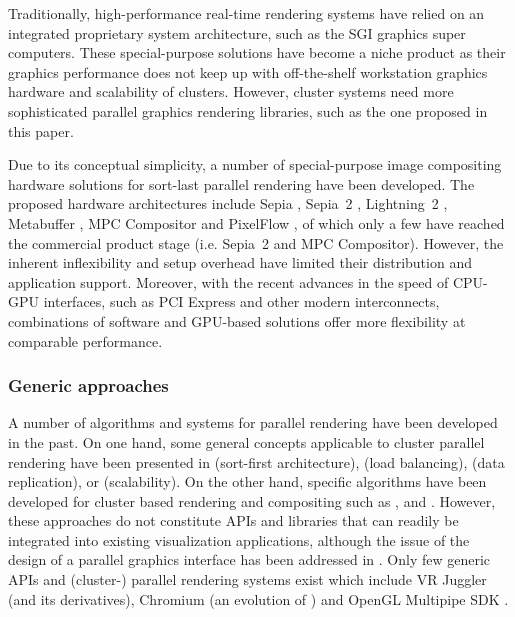 \documentclass[journal]{vgtc}                %
\begin{document}
Traditionally,  high-performance real-time rendering systems have relied on an integrated proprietary system architecture, such as the SGI graphics super computers. These special-purpose solutions have become a niche product as their graphics performance does not keep up with off-the-shelf workstation graphics hardware and scalability of clusters. However, cluster systems need more sophisticated parallel graphics rendering libraries, such as the one proposed in this paper.

Due to its conceptual simplicity, a number of special-purpose image compositing hardware solutions for sort-last parallel rendering have been developed. The proposed hardware architectures include Sepia \cite {MHS:99a,sepia}, Sepia~2 \cite{LMSBHa:01,LMSBH:01}, Lightning~2 \cite{Stoll01}, Metabuffer \cite{Blanke00,Zhang01}, MPC Compositor \cite{Muraki01} and PixelFlow \cite{Molnar92, Eyles97}, of which only a few have reached the commercial product stage (i.e. Sepia~2 and MPC Compositor). However, the inherent inflexibility and setup overhead have limited their distribution and application support. Moreover, with the recent advances in the speed of CPU-GPU interfaces, such as PCI Express and other modern interconnects, combinations of software and GPU-based solutions offer more flexibility at comparable performance.


\subsubsection*{Generic approaches}

A number of algorithms and systems for parallel rendering have been developed in the past. On one hand, some general concepts applicable to cluster parallel rendering have been presented in \cite{Mueller:95,Mueller:97} (sort-first architecture), \cite{SZFLS:99,SFLS:00} (load balancing), \cite{SFL:01} (data replication), or \cite{CMF:05,CM:06} (scalability). On the other hand, specific algorithms have been developed for cluster based rendering and compositing such as \cite{AP:98}, \cite{CKS:02} and \cite{YYC:01,SMLAP:03}. However, these approaches do not constitute APIs and libraries that can readily be integrated into existing visualization applications, although the issue of the design of a parallel graphics interface has been addressed in \cite{Igehy98}.
%
Only few generic APIs and (cluster-) parallel rendering systems exist which include VR Juggler \cite{BJHMBC:01} (and its derivatives), Chromium \cite{HHNFAKK:02} (an evolution of \cite{Humphreys99,Humphreys00,HEBSEH:01}) and OpenGL Multipipe SDK \cite{JDBJBCER:04,BRE:05,MPK}.
\end{document}
